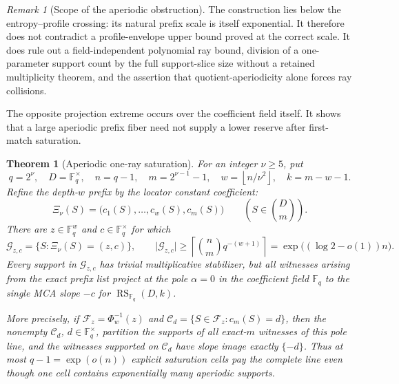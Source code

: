 \documentclass[11pt,a4paper]{amsart}
\numberwithin{equation}{section}
\newtheorem{theorem}{Theorem}[section]
\theoremstyle{remark}
\newtheorem{remark}[remark]{Remark}
\DeclareMathOperator{\RS}{RS}
\newcommand{\F}{\mathbb F}
\newcommand{\Ccal}{\mathcal C}
\newcommand{\Fcal}{\mathcal F}
\newcommand{\Gcal}{\mathcal G}
\newcommand{\abs}[1]{\lvert #1\rvert}
\newcommand{\floor}[1]{\left\lfloor #1\right\rfloor}
\newcommand{\ceil}[1]{\left\lceil #1\right\rceil}
\begin{document}
\begin{remark}[Scope of the aperiodic obstruction]
The construction lies below the entropy--profile crossing: its natural
prefix scale is itself exponential.  It therefore does not contradict a
profile-envelope upper bound proved at the correct scale.  It does rule
out a field-independent polynomial ray bound, division of a one-parameter
support count by the full support-slice size without a retained multiplicity
theorem, and the assertion
that quotient-aperiodicity alone forces ray collisions.
\end{remark}

The opposite projection extreme occurs over the coefficient field itself.
It shows that a large aperiodic prefix fiber need not supply a lower
reserve after first-match saturation.

\begin{theorem}[Aperiodic one-ray saturation]
\label{thm:aperiodic-one-ray-saturation}
For an integer \(\nu\ge5\), put
\[
 q=2^\nu,\quad D=\F_q^\times,\quad n=q-1,\quad
 m=2^{\nu-1}-1,\quad w=\floor{n/\nu^2},\quad k=m-w-1.
\]
Refine the depth-\(w\) prefix by the locator constant coefficient:
\[
 \Xi_\nu(S)=\bigl(c_1(S),\ldots,c_w(S),c_m(S)\bigr)
 \qquad\left(S\in\binom Dm\right).
\]
There are \(z\in\F_q^w\) and \(c\in\F_q^\times\) for which
\[
 \Gcal_{z,c}=\{S:\Xi_\nu(S)=(z,c)\},
 \qquad
 \abs{\Gcal_{z,c}}
 \ge\ceil{\binom nm q^{-(w+1)}}
 =\exp\bigl((\log2-o(1))n\bigr).                  \tag{SAT1}
\label{eq:one-ray-large-fiber}
\]
Every support in \(\Gcal_{z,c}\) has trivial multiplicative stabilizer,
but all witnesses arising from the exact prefix list project at the pole
\(\alpha=0\) in the coefficient field \(\F_q\) to the single MCA slope \(-c\) for
\(\RS_{\F_q}(D,k)\).

More precisely, if \(\Fcal_z=\Phi_w^{-1}(z)\) and
\(\Ccal_d=\{S\in\Fcal_z:c_m(S)=d\}\), then the nonempty
\(\Ccal_d\), \(d\in\F_q^\times\), partition the supports of all
exact-\(m\) witnesses of this pole line, and the witnesses supported on
\(\Ccal_d\) have slope image exactly \(\{-d\}\).  Thus at most
\(q-1=\exp(o(n))\) explicit saturation cells
pay the complete line even though one cell contains exponentially many
aperiodic supports.
\end{theorem}
\end{document}
